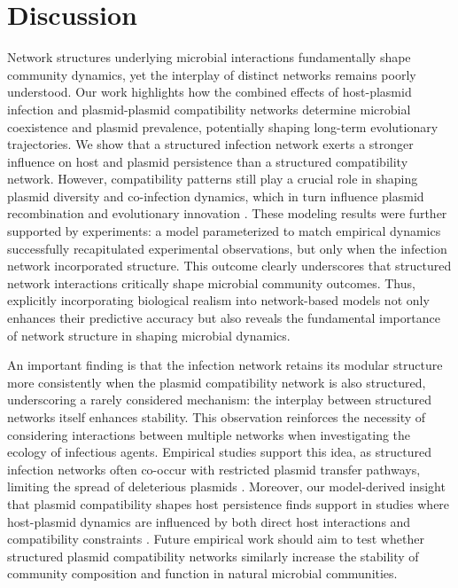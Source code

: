 \documentclass[10pt,letterpaper]{article}
\begin{document}
\section*{Discussion}
\noindent Network structures underlying microbial interactions fundamentally shape community dynamics, yet the interplay of distinct networks remains poorly understood. Our work highlights how the combined effects of host-plasmid infection and plasmid-plasmid compatibility networks determine microbial coexistence and plasmid prevalence, potentially shaping long-term evolutionary trajectories. We show that a structured infection network exerts a stronger influence on host and plasmid persistence than a structured compatibility network. However, compatibility patterns still play a crucial role in shaping plasmid diversity and co-infection dynamics, which in turn influence plasmid recombination and evolutionary innovation \cite{Rodriguez-Beltran2021-ue}. These modeling results were further supported by experiments: a model parameterized to match empirical dynamics successfully recapitulated experimental observations, but only when the infection network incorporated structure. This outcome clearly underscores that structured network interactions critically shape microbial community outcomes. Thus, explicitly incorporating biological realism into network-based models not only enhances their predictive accuracy but also reveals the fundamental importance of network structure in shaping microbial dynamics. 

An important finding is that the infection network retains its modular structure more consistently when the plasmid compatibility network is also structured, underscoring a rarely considered mechanism: the interplay between structured networks itself enhances stability. This observation reinforces the necessity of considering interactions between multiple networks when investigating the ecology of infectious agents. Empirical studies support this idea, as structured infection networks often co-occur with restricted plasmid transfer pathways, limiting the spread of deleterious plasmids \cite{Risely2024-ls}. Moreover, our model-derived insight that plasmid compatibility shapes host persistence finds support in studies where host-plasmid dynamics are influenced by both direct host interactions and compatibility constraints \cite{Rocha2022-ub}. Future empirical work should aim to test whether structured plasmid compatibility networks similarly increase the stability of community composition and function in natural microbial communities.
\end{document}
